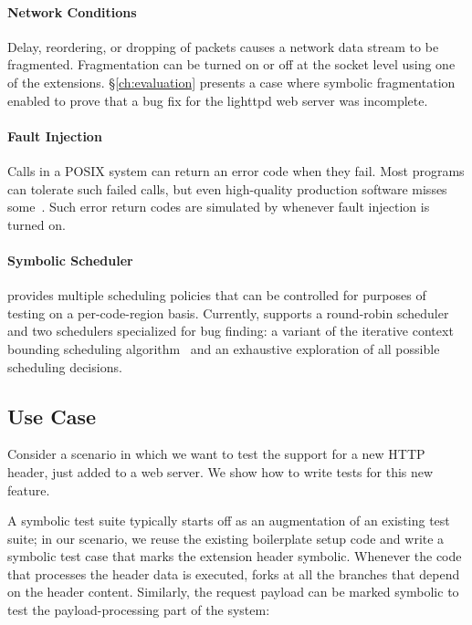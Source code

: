 \paragraph{Network Conditions} Delay, reordering, or dropping of packets causes a network data stream to be fragmented.  Fragmentation can be turned on or off at the socket level using one of the \cnine {} extensions.  \S\ref{ch:evaluation} presents a case where symbolic fragmentation enabled \cnine to prove that a bug fix for the lighttpd web server was incomplete. 

\paragraph{Fault Injection} Calls in a POSIX system can return an error code when they fail. Most programs can tolerate such failed calls, but even high-quality production software misses some~\cite{lfi}. Such error return codes are simulated by \cnine whenever fault injection is turned on. 

\paragraph{Symbolic Scheduler} \cnine provides multiple scheduling policies that can be controlled for purposes of testing on a per-code-region basis.  Currently, \cnine supports a round-robin scheduler and two schedulers specialized for bug finding: a variant of the iterative context bounding scheduling algorithm~\cite{chess} and an exhaustive exploration of all possible scheduling decisions.  


\subsection{Use Case}

Consider a scenario in which we want to test the support for a new  HTTP header, just added to a web server. We show how to write tests for this new feature. 

A symbolic test suite typically starts off as an augmentation of an existing test suite; in our scenario, we reuse the existing boilerplate setup code and write a symbolic test case that marks the extension header symbolic. Whenever the code that processes the header data is executed, \cnine forks at all the branches that depend on the header content. Similarly, the request payload can be marked symbolic to test the payload-processing part of the system:

